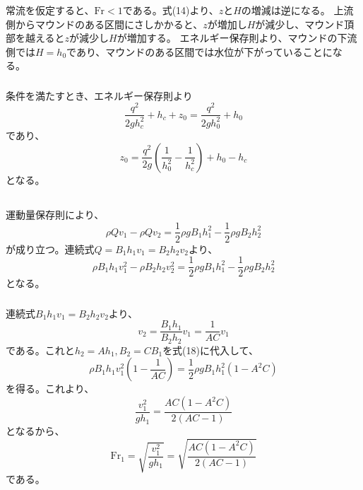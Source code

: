 \documentclass[a4paper]{jsarticle}
\begin{document}
\subsubsection{}
常流を仮定すると、$\mathrm{Fr} < 1$である。式(14)より、$z$と$H$の増減は逆になる。
上流側からマウンドのある区間にさしかかると、$z$が増加し$H$が減少し、マウンド頂部を越えると$z$が減少し$H$が増加する。
エネルギー保存則より、マウンドの下流側では$H = h_0$であり、マウンドのある区間では水位が下がっていることになる。

\subsubsection{}
条件を満たすとき、エネルギー保存則より
\begin{equation}
  \frac{q^2}{2g h_c^2} + h_c + z_0 = \frac{q^2}{2g h_0^2} + h_0
\end{equation}
であり、
\begin{equation}
  z_0 = \frac{q^2}{2g} \left(\frac{1}{h_0^2} - \frac{1}{h_c^2}\right) + h_0 - h_c
\end{equation}
となる。

\subsection{}
\subsubsection{}
運動量保存則により、
\begin{equation}
  \rho Q v_1 - \rho Q v_2 = \frac{1}{2} \rho g B_1 h_1^2 - \frac{1}{2} \rho g B_2 h_2^2
\end{equation}
が成り立つ。連続式$Q = B_1 h_1 v_1 = B_2 h_2 v_2$より、
\begin{equation}
  \rho B_1 h_1 v_1^2 - \rho B_2 h_2 v_2^2 = \frac{1}{2} \rho g B_1 h_1^2 - \frac{1}{2} \rho g B_2 h_2^2
\end{equation}
となる。

\subsubsection{}
連続式$B_1 h_1 v_1 = B_2 h_2 v_2$より、
\begin{equation}
  v_2 = \frac{B_1 h_1}{B_2 h_2} v_1 = \frac{1}{A C} v_1
\end{equation}
である。これと$h_2 = A h_1, B_2 = C B_1$を式(18)に代入して、
\begin{equation}
  \rho B_1 h_1 v_1^2 \left(1 - \frac{1}{A C}\right)
  = \frac{1}{2} \rho g B_1 h_1^2 (1 - A^2 C)
\end{equation}
を得る。これより、
\begin{equation}
  \frac{v_1^2}{g h_1} = \frac{A C (1 - A^2 C)}{2 (A C - 1)}
\end{equation}
となるから、
\begin{equation}
  \mathrm{Fr}_1 = \sqrt{\frac{v_1^2}{g h_1}} = \sqrt{\frac{A C (1 - A^2 C)}{2 (A C - 1)}}
\end{equation}
である。

\section{}
\subsection{}
\subsubsection{}
\end{document}
